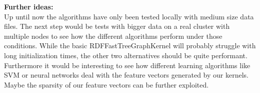 \documentclass{easychair}
\begin{document}
\textbf{Further ideas:}\\
Up until now the algorithms have only been tested locally with medium size data files. The next step would be tests with bigger data on a real cluster with multiple nodes to see how the different algorithms perform under those conditions. While the basic RDFFastTreeGraphKernel will probably struggle with long initialization times, the other two alternatives should be quite performant. Furthermore it would be interesting to see how different learning algorithms like SVM or neural networks deal with the feature vectors generated by our kernels. Maybe the sparsity of our feature vectors can be further exploited.



%
\label{sect:bib}

%
%
%



\end{document}
